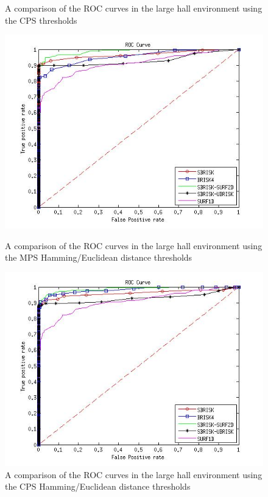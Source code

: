 \documentclass{report}
\begin{document}
\begin{figure}[h!]
\begin{minipage}[b]{0.5\linewidth}
\caption{A comparison of the ROC curves in the large hall environment using the CPS thresholds}
\label{fig:compareKnnConsistentOffice3}
\end{minipage}
\begin{minipage}[b]{0.5\linewidth}
\includegraphics[scale=0.4]{../Drawings/dataset3_ROC_General_Hamming.jpg}
\caption{A comparison of the ROC curves in the large hall environment using the MPS Hamming/Euclidean distance thresholds}
\label{fig:compareHammingOffice3}
\end{minipage}
\hspace{0.5cm}
\begin{minipage}[b]{0.5\linewidth}
\includegraphics[scale=0.4]{../Drawings/dataset3_ROC_General_Hamming_Consistent.jpg}
\caption{A comparison of the ROC curves in the large hall environment using the CPS Hamming/Euclidean distance thresholds}
\label{fig:compareHammingConsistentOffice3}
\end{minipage}
\end{figure}
\end{document}
